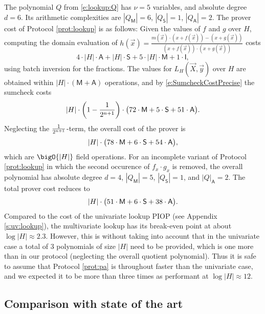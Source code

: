 \documentclass[11pt]{article}
\theoremstyle{definition}
\theoremstyle{remark}
\begin{document}
The polynomial $Q$ from \eqref{e:lookup:Q} has $\nu=5$ variables, and absolute degree $d=6$. 
Its arithmetic complexities are $|Q_\mathsf M| = 6$, $|Q_\mathsf S| = 1$, $|Q_\mathsf A| = 2$.
The prover cost of Protocol \ref{prot:lookup} is as follows:
Given the values of $f$ and $g$ over $H$, computing the domain evaluation of $h(\vec x) = \frac{m(\vec x)\cdot (x + f(\vec x)) - (x + g(\vec x))}{(x + f(\vec x))\cdot (x + g(\vec x))}$ costs
\[
4\cdot |H| \cdot \mathsf A + |H|\cdot \mathsf S + 5\cdot |H|\cdot \mathsf M + 1 \cdot \mathsf I ,
\]
using batch inversion for the fractions.
The values for $L_H(\vec X, \vec y)$ over $H$ are obtained within $|H|\cdot (\mathsf M + \mathsf A)$ operations, and by \eqref{e:SumcheckCostPrecise} the sumcheck costs  
\begin{equation*}
|H| \cdot \left(1-\frac{1}{2^{n+1}}\right)\cdot \big(72 \cdot\textsf M +  5\cdot\textsf S + 51 \cdot \textsf A\big).
\end{equation*}
Neglecting the $\nicefrac{1}{2^{n+1}}$-term, the overall cost of the prover is 
\begin{equation}
\label{e:lookup:cost}
|H| \cdot \big(78\cdot\textsf M +  6\cdot\textsf S + 54 \cdot \textsf A\big),
\end{equation}
which are $\bigO{|H|}$ field operations.
For an incomplete variant of Protocol \ref{prot:lookup} in which the second occurence of $f_x\cdot g_x$ is removed,
the overall polynomial has absolute degree $d=4$, $|Q_\mathsf M| = 5$, $|Q_\mathsf S|= 1$, and $|Q|_\mathsf A = 2$.
The total prover cost reduces to 
\begin{equation}
\label{e:lookup:incomplete:cost}
|H| \cdot \big(51 \cdot\textsf M +  6\cdot\textsf S + 38 \cdot \textsf A\big).
\end{equation}
Compared to the cost of the univariate lookup PIOP (see Appendix \ref{s:uv:lookup}), the multivariate lookup has its break-even point at about $\log |H| \approx 2.3$.
However, this is without taking into account that in the univariate case a total of $3$ polynomials of size $|H|$ need to be provided, which is one more than in our protocol (neglecting the overall quotient polynomial). 
Thus it is safe to assume that Protocol \ref{prot:pa} is throughout faster than the univariate case, and we expected it to be more than three times as performant at $\log|H| \approx 12$.

\subsection{Comparison with state of the art}
\end{document}
